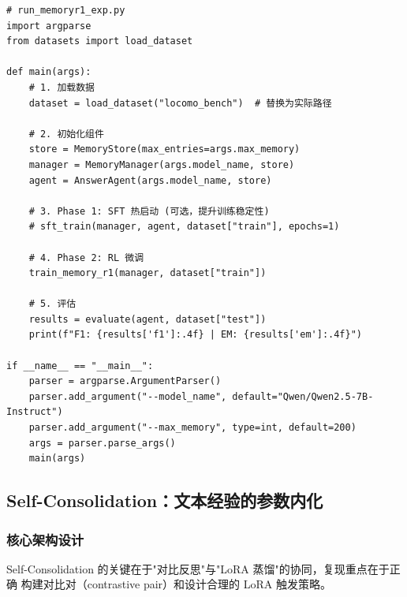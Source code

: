 \documentclass[11pt,a4paper]{article}
\begin{document}
\begin{lstlisting}[style=pythonstyle, caption={完整实验运行脚本骨架}]
# run_memoryr1_exp.py
import argparse
from datasets import load_dataset

def main(args):
    # 1. 加载数据
    dataset = load_dataset("locomo_bench")  # 替换为实际路径

    # 2. 初始化组件
    store = MemoryStore(max_entries=args.max_memory)
    manager = MemoryManager(args.model_name, store)
    agent = AnswerAgent(args.model_name, store)

    # 3. Phase 1: SFT 热启动 (可选，提升训练稳定性)
    # sft_train(manager, agent, dataset["train"], epochs=1)

    # 4. Phase 2: RL 微调
    train_memory_r1(manager, dataset["train"])

    # 5. 评估
    results = evaluate(agent, dataset["test"])
    print(f"F1: {results['f1']:.4f} | EM: {results['em']:.4f}")

if __name__ == "__main__":
    parser = argparse.ArgumentParser()
    parser.add_argument("--model_name", default="Qwen/Qwen2.5-7B-Instruct")
    parser.add_argument("--max_memory", type=int, default=200)
    args = parser.parse_args()
    main(args)
\end{lstlisting}

\subsection{Self-Consolidation：文本经验的参数内化}

\subsubsection{核心架构设计}

Self-Consolidation 的关键在于"对比反思"与"LoRA 蒸馏"的协同，复现重点在于正确
构建对比对（contrastive pair）和设计合理的 LoRA 触发策略。
\end{document}
